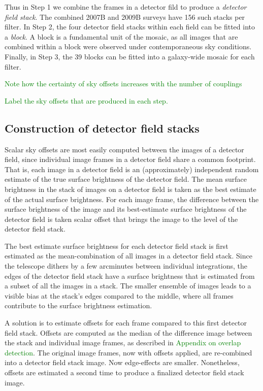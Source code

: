 \documentclass[iop]{emulateapj}
\newcommand{\todo}[1]{\textcolor{green}{#1}}
\begin{document}
Thus in Step 1 we combine the frames in a detector fild to produce a \emph{detector field stack}. The combined 2007B and 2009B surveys have 156 such stacks per filter. In Step 2, the four detector field stacks within each field can be fitted into a \emph{block}. A block is a fundamental unit of the mosaic, as all images that are combined within a block were observed under contemporaneous sky conditions. Finally, in Step 3, the 39 blocks can be fitted into a galaxy-wide mosaic for each filter.

\todo{Note how the certainty of sky offsets increases with the number of couplings}

\todo{Label the sky offsets that are produced in each step.}

\subsection{Construction of detector field stacks}
\label{sec:stacks}

Scalar sky offsets are most easily computed between the images of a detector field, since individual image frames in a detector field share a common footprint. That is, each image in a detector field is an (approximately) independent random estimate of the true surface brightness of the detector field. The mean surface brightness in the stack of images on a detector field is taken as the best estimate of the actual surface brightness. For each image frame, the difference between the surface brightness of the image and its best-estimate surface brightness of the detector field is taken scalar offset that brings the image to the level of the detector field stack.

The best estimate surface brightness for each detector field stack is first estimated as the mean-combination of all images in a detector field stack.  Since the telescope dithers by a few arcminutes between individual integrations, the edges of the detector field stack have a surface brightness that is estimated from a subset of all the images in a stack. The smaller ensemble of images leads to a visible bias at the stack's edges compared to the middle, where all frames contribute to the surface brightness estimation.

A solution is to estimate offsets for each frame compared to this first detector field stack. Offsets are computed as the median of the difference image between the stack and individual image frames, as described in \todo{Appendix on overlap detection}. The original image frames, now with offsets applied, are re-combined into a detector field stack image. Now edge-effects are smaller. Nonetheless, offsets are estimated a second time to produce a finalized detector field stack image.
\end{document}
